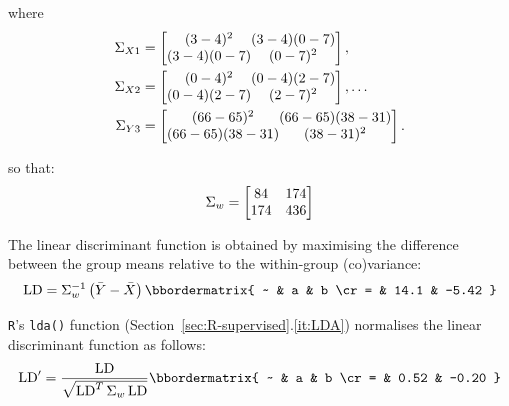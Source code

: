 \noindent where
\begin{align}
  \Sigma_{X1} & =
  \left[
  \begin{array}{@{}c@{}c@{}}
    (3-4)^2 & (3-4)(0-7) \cr
    (3-4)(0-7) & (0-7)^2
  \end{array}
  \right], \\
  \Sigma_{X2} & =
  \left[
  \begin{array}{@{}c@{}c@{}}
    (0-4)^2 & (0-4)(2-7) \cr
    (0-4)(2-7) & (2-7)^2
  \end{array}
  \right], \ldots \\
  \Sigma_{Y3} & =
  \left[
  \begin{array}{@{}c@{}c@{}}
    (66-65)^2 & (66-65)(38-31) \cr
    (66-65)(38-31) & (38-31)^2
  \end{array}
  \right].
\end{align}

\noindent so that:
\begin{equation}
  \Sigma_w =   \left[
  \begin{array}{@{}cc@{}}
    84 & 174 \cr
    174 & 436
  \end{array}
  \right]  
\end{equation}

The linear discriminant function is obtained by maximising the
difference between the group means relative to the within-group
(co)variance:
\begin{equation}
  \mbox{LD} = \Sigma_w^{-1} \left(\bar{Y}-\bar{X}\right)
  \bbordermatrix{
    ~ & a & b \cr
    = & 14.1 & -5.42 }
  \label{eq:LD}
\end{equation}

\texttt{R}'s \texttt{lda()} function
(Section~\ref{sec:R-supervised}.\ref{it:LDA}) normalises the linear
discriminant function as follows:
\begin{equation}
  \mbox{LD}' = \frac{\mbox{LD}}{\sqrt{\mbox{LD}^T\,\Sigma_w\,\mbox{LD}}}
  \bbordermatrix{
    ~ & a & b \cr
    = & 0.52 & -0.20
  }
  \label{eq:LD1'}
\end{equation}

